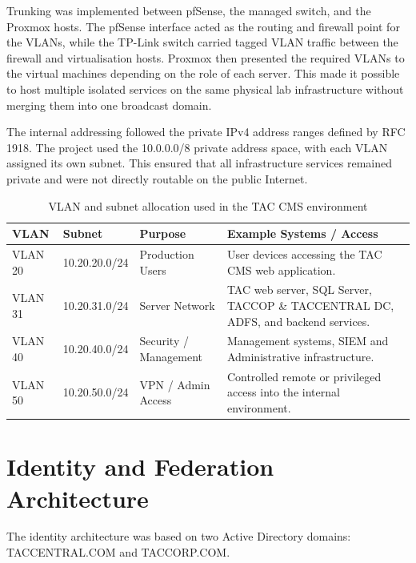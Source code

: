 Trunking was implemented between pfSense, the managed switch, and the Proxmox hosts. The pfSense interface acted as the routing and firewall point for the VLANs, while the TP-Link switch carried tagged VLAN traffic between the firewall and virtualisation hosts. Proxmox then presented the required VLANs to the virtual machines depending on the role of each server. This made it possible to host multiple isolated services on the same physical lab infrastructure without merging them into one broadcast domain.

The internal addressing followed the private IPv4 address ranges defined by RFC 1918. The project used the 10.0.0.0/8 private address space, with each VLAN assigned its own subnet. This ensured that all infrastructure services remained private and were not directly routable on the public Internet.

\vspace{1cm}

\begin{table}[H]
\centering
\small
\renewcommand{\arraystretch}{1.2}
\begin{tabularx}{\textwidth}{|p{2.2cm}|p{3.2cm}|p{3.2cm}|X|}
\hline
\textbf{VLAN} & \textbf{Subnet} & \textbf{Purpose} & \textbf{Example Systems / Access} \\
\hline
VLAN 20 & 10.20.20.0/24 & Production Users & User devices accessing the TAC CMS web application. \\
\hline
VLAN 31 & 10.20.31.0/24 & Server Network & TAC web server, SQL Server, TACCOP \& TACCENTRAL DC, ADFS, and backend services. \\
\hline
VLAN 40 & 10.20.40.0/24 & Security / Management & Management systems, SIEM  and Administrative infrastructure. \\
\hline
VLAN 50 & 10.20.50.0/24 & VPN / Admin Access & Controlled remote or privileged access into the internal environment. \\
\hline
\end{tabularx}
\caption{VLAN and subnet allocation used in the TAC CMS environment}
\label{tab:vlan-subnet-allocation}
\end{table}


\section{Identity and Federation Architecture}

The identity architecture was based on two Active Directory domains: TACCENTRAL.COM and TACCORP.COM. 

